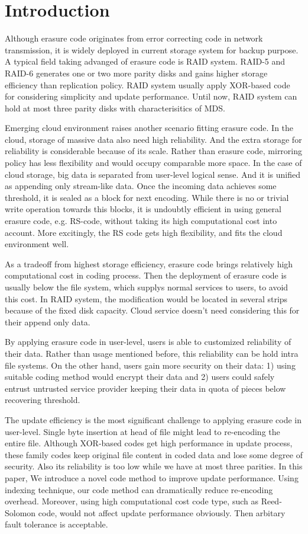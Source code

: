 \documentclass[a4paper, 12pt]{article}
\begin{document}
\section{Introduction}

Although erasure code originates from error correcting code in network
transmission, it is widely deployed in current storage system for
backup purpose. A typical field taking advanged of erasure code is
RAID system. RAID-5 and RAID-6 generates one or two more parity disks
and gains higher storage efficiency than replication policy. RAID
system usually apply XOR-based code for considering simplicity and
update performance. Until now, RAID system can hold at most three
parity disks with characterisitics of MDS.

Emerging cloud environment raises another scenario fitting erasure
code. In the cloud, storage of massive data also need high
reliability. And the extra storage for reliability is considerable
because of its scale. Rather than erasure code, mirroring policy has
less flexibility and would occupy comparable more space. In the case
of cloud storage, big data is separated from user-level logical
sense. And it is unified as appending only stream-like data. Once the
incoming data achieves some threshold, it is sealed as a block for
next encoding. While there is no or trivial write operation towards
this blocks, it is undoubtly efficient in using general erasure code,
e.g. RS-code, without taking its high computational cost into
account. More excitingly, the RS code gets high flexibility, and fits
the cloud environment well.  

As a tradeoff from highest storage efficiency, erasure code brings
relatively high computational cost in coding process. Then the
deployment of erasure code is usually below the file system, which supplys
normal services to users, to avoid this cost. In RAID system, the
modification would be located in several strips because of the fixed
disk capacity. Cloud service doesn't need considering this for their
append only data.

By applying erasure code in user-level, users is able to customized
reliability of their data. Rather than usage mentioned before, this
reliability can be hold intra file systems. On the other hand, users
gain more security on their data: 1) using suitable coding method
would encrypt their data and 2) users could safely entrust untrusted
service provider keeping their data in quota of pieces below recovering
threshold. 

The update efficiency is the most significant challenge to applying
erasure code in user-level. Single byte insertion at head of file
might lead to re-encoding the entire file. Although XOR-based codes
get high performance in update process, these family codes keep
original file content in coded data and lose some degree of
security. Also its reliability is too low while we have at most three
parities. In this paper, We introduce a novel code method to improve
update performance. Using indexing technique, our code method can
dramatically reduce re-encoding overhead. Moreover, using high
computational cost code type, such as Reed-Solomon code, would not
affect update performance obviously. Then arbitary fault tolerance is
acceptable.
\end{document}
